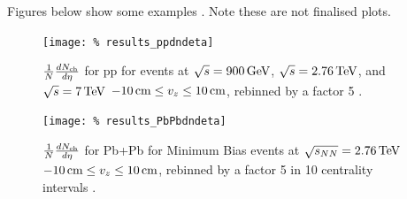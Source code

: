 \documentclass[11pt]{article}
\def\AlwaysText#1{\ifmmode\relax\text{#1}\else #1\fi}
\newcommand{\AbbrName}[1]{\AlwaysText{{\scshape #1}}}
\newcommand{\INEL}{\AbbrName{inel}}
\newcommand{\INELONE}{$\AbbrName{inel}>0$}
\newcommand{\NSD}{\AbbrName{nsd}}
\newcommand{\mult}[1][]{\ensuremath N_{\text{ch}#1}}
\newcommand{\dndeta}[1][]{{\ensuremath%
    \ifx|#1|\else\left.\fi%
    \frac{1}{N}\frac{d\mult{}}{d\eta}%
    \ifx|#1|\else\right|_{#1}\fi%
}}
\newcommand{\GeV}[1]{\unit[#1]{\AlwaysText{GeV}}}
\newcommand{\TeV}[1]{\unit[#1]{\AlwaysText{TeV}}}
\newcommand{\cm}[1]{\unit[#1]{\AlwaysText{cm}}}
\begin{document}
Figures below show some examples \cite{hhd:2009}.  Note these are not finalised
plots. 
\begin{figure}[]
  \centering
  \texttt{[image: \%
    results\_ppdndeta]}
  \caption{$\dndeta$ for pp for \INEL{} events at
    $\sqrt{s}=\GeV{900}$, $\sqrt{s}=\TeV{2.76}$, and $\sqrt{s}=\TeV{7}$
    $\cm{-10}\le v_z\le\cm{10}$, rebinned by a factor 5 \cite{hhd:2009}. 
}
  \label{fig:1}
\end{figure} 
\begin{figure}[]
  \centering
  \texttt{[image: \%
    results\_PbPbdndeta]}
  \caption{$\dndeta$ for Pb+Pb for Minimum Bias events at
    $\sqrt{s_{NN}}=\TeV{2.76}$ $\cm{-10}\le v_z\le\cm{10}$, rebinned by a
    factor 5 in 10 centrality intervals \cite{hhd:2009}. 
}
  \label{fig:2}
\end{figure} 

\clearpage
\end{document}
